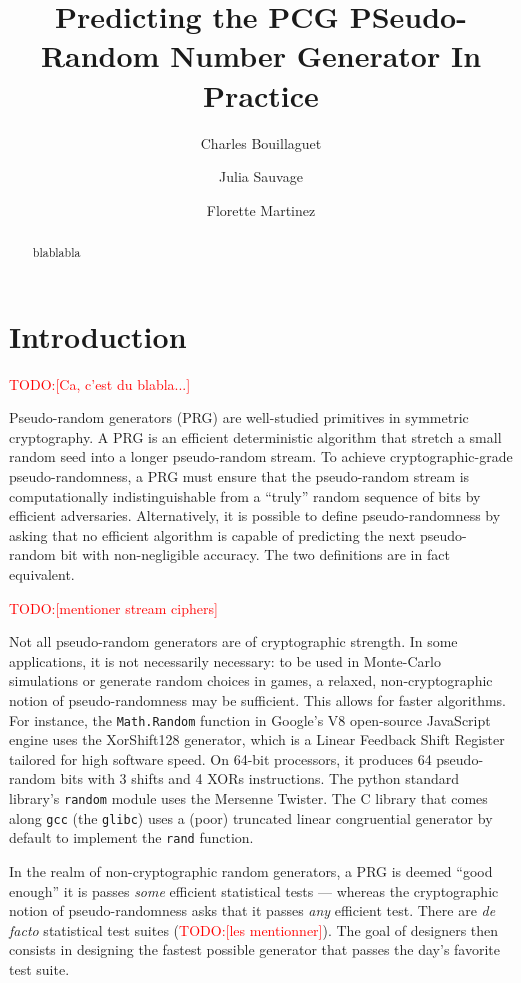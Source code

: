 \documentclass[preprint]{iacrtrans}
\title{Predicting the PCG PSeudo-Random Number Generator In Practice}
\author{Charles Bouillaguet\inst{1} \and Julia Sauvage\inst{2} \and Florette Martinez\inst{3}}
\institute{%
University of Lille, France \\ 
\email{charles.bouillaguet@univ-lille.fr}
\and 
Sorbonne University \\
\email{julia.sauvage@etu.upmc.fr}
\and 
LIP6, CNRS, SU ? \\
\email{florette.martinez@lip6.fr}

}
\newcommand{\todo}[1]{\textcolor{red}{TODO:[#1]}}
\begin{document}
\maketitle


\begin{abstract}
  blablabla
\end{abstract}

\section{Introduction} %

\todo{Ca, c'est du blabla...}

Pseudo-random generators (PRG) are well-studied primitives in symmetric
cryptography. A PRG is an efficient deterministic algorithm that stretch a small
random seed into a longer pseudo-random stream. To achieve cryptographic-grade
pseudo-randomness, a PRG must ensure that the pseudo-random stream is
computationally indistinguishable from a ``truly'' random sequence of bits by
efficient adversaries. Alternatively, it is possible to define pseudo-randomness
by asking that no efficient algorithm is capable of predicting the next
pseudo-random bit with non-negligible accuracy. The two definitions are in fact
equivalent.

\todo{mentioner stream ciphers}

Not all pseudo-random generators are of cryptographic strength. In some
applications, it is not necessarily necessary: to be used in Monte-Carlo
simulations or generate random choices in games, a relaxed, non-cryptographic
notion of pseudo-randomness may be sufficient. This allows for faster
algorithms. For instance, the \texttt{Math.Random} function in Google's V8
open-source JavaScript engine uses the \textsf{XorShift128} generator, which is
a Linear Feedback Shift Register tailored for high software speed. On 64-bit
processors, it produces 64 pseudo-random bits with 3 shifts and 4 XORs
instructions. The \textsf{python} standard library's \texttt{random} module uses
the Mersenne Twister. The \textsf{C} library that comes along \texttt{gcc} (the
\texttt{glibc}) uses a (poor) truncated linear congruential generator by default
to implement the \texttt{rand} function.

In the realm of non-cryptographic random generators, a PRG is deemed ``good
enough'' it is passes \emph{some} efficient statistical tests --- whereas the
cryptographic notion of pseudo-randomness asks that it passes \emph{any}
efficient test. There are \textit{de facto} statistical test suites (\todo{les
  mentionner}). The goal of designers then consists in designing the fastest
possible generator that passes the day's favorite test suite.
\end{document}

